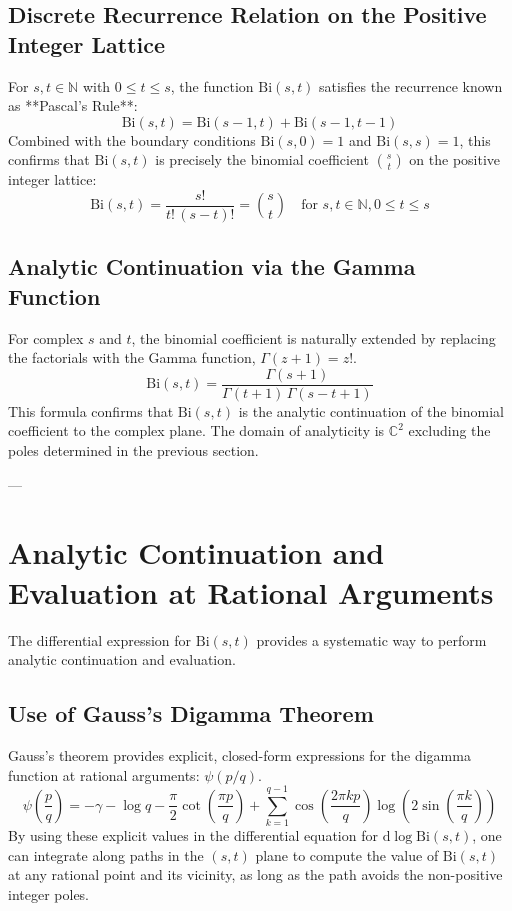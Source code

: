 \documentclass{article}
\newcommand{\Bi}{\mathrm{Bi}}
\newcommand{\diff}{\mathrm{d}}
\newcommand{\eulergam}{\gamma} %
\begin{document}
\subsection{Discrete Recurrence Relation on the Positive Integer Lattice}
For $s, t \in \mathbb{N}$ with $0 \leq t \leq s$, the function $\Bi(s,t)$ satisfies the recurrence known as **Pascal's Rule**:
\begin{equation}
\Bi(s,t) = \Bi(s-1,t) + \Bi(s-1,t-1)
\end{equation}
Combined with the boundary conditions $\Bi(s,0) = 1$ and $\Bi(s,s) = 1$, this confirms that $\Bi(s,t)$ is precisely the binomial coefficient $\binom{s}{t}$ on the positive integer lattice:
\begin{equation}
\Bi(s,t) = \frac{s!}{t!\,(s-t)!} = \binom{s}{t} \quad \text{for } s, t \in \mathbb{N}, 0 \leq t \leq s
\end{equation}

\subsection{Analytic Continuation via the Gamma Function}
For complex $s$ and $t$, the binomial coefficient is naturally extended by replacing the factorials with the Gamma function, $\Gamma(z+1) = z!$.
\begin{equation}
\Bi(s,t) = \frac{\Gamma(s+1)}{\Gamma(t+1)\,\Gamma(s-t+1)}
\end{equation}
This formula confirms that $\Bi(s,t)$ is the analytic continuation of the binomial coefficient to the complex plane. The domain of analyticity is $\mathbb{C}^2$ excluding the poles determined in the previous section.

---

\section{Analytic Continuation and Evaluation at Rational Arguments}

The differential expression for $\Bi(s,t)$ provides a systematic way to perform analytic continuation and evaluation.

\subsection{Use of Gauss's Digamma Theorem}
Gauss's theorem provides explicit, closed-form expressions for the digamma function at rational arguments: $\psi(p/q)$.
$$
\psi\left(\frac{p}{q}\right) = -\eulergam - \log q - \frac{\pi}{2} \cot\left(\frac{\pi p}{q}\right) + \sum_{k=1}^{q-1} \cos\left(\frac{2\pi k p}{q}\right) \log\left(2 \sin\left(\frac{\pi k}{q}\right)\right)
$$
By using these explicit values in the differential equation for $\diff \log \Bi(s,t)$, one can integrate along paths in the $(s,t)$ plane to compute the value of $\Bi(s,t)$ at any rational point and its vicinity, as long as the path avoids the non-positive integer poles.
\end{document}
